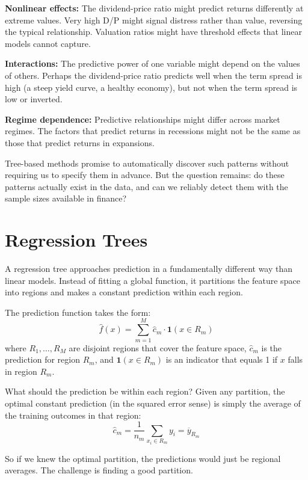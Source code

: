 \documentclass[11pt,a4paper]{article}
\begin{document}
\textbf{Nonlinear effects:} The dividend-price ratio might predict returns differently at extreme values. Very high D/P might signal distress rather than value, reversing the typical relationship. Valuation ratios might have threshold effects that linear models cannot capture.

\textbf{Interactions:} The predictive power of one variable might depend on the values of others. Perhaps the dividend-price ratio predicts well when the term spread is high (a steep yield curve, a healthy economy), but not when the term spread is low or inverted.

\textbf{Regime dependence:} Predictive relationships might differ across market regimes. The factors that predict returns in recessions might not be the same as those that predict returns in expansions.

Tree-based methods promise to automatically discover such patterns without requiring us to specify them in advance. But the question remains: do these patterns actually exist in the data, and can we reliably detect them with the sample sizes available in finance?

\section{Regression Trees}

A regression tree approaches prediction in a fundamentally different way than linear models. Instead of fitting a global function, it partitions the feature space into regions and makes a constant prediction within each region.

The prediction function takes the form:
\[
\widehat{f}(x) = \sum_{m=1}^{M} \widehat{c}_m \cdot \mathbf{1}(x \in R_m)
\]
where $R_1, \ldots, R_M$ are disjoint regions that cover the feature space, $\widehat{c}_m$ is the prediction for region $R_m$, and $\mathbf{1}(x \in R_m)$ is an indicator that equals 1 if $x$ falls in region $R_m$.

What should the prediction be within each region? Given any partition, the optimal constant prediction (in the squared error sense) is simply the average of the training outcomes in that region:
\[
\widehat{c}_m = \frac{1}{n_m} \sum_{x_i \in R_m} y_i = \overline{y}_{R_m}
\]

So if we knew the optimal partition, the predictions would just be regional averages. The challenge is finding a good partition.
\end{document}
